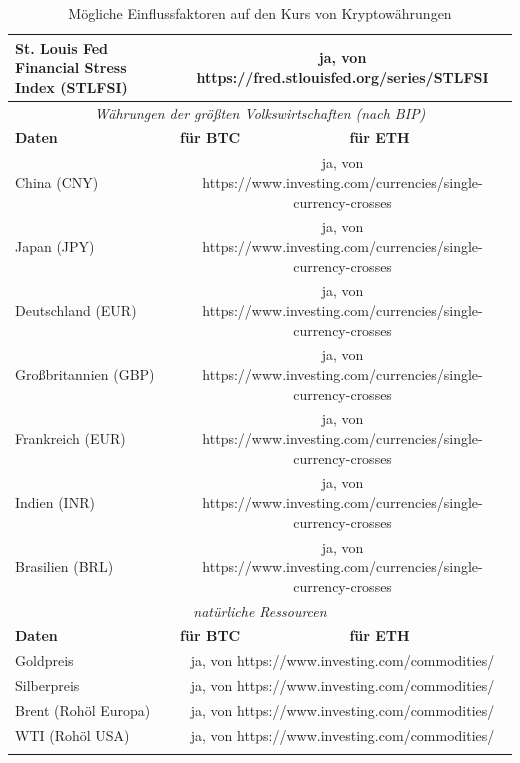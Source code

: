 \begin{longtable}[H]{|p{4cm}|p{}|p{}|}
St. Louis Fed Financial Stress Index (STLFSI) & \multicolumn{2}{c}{ja, von https://fred.stlouisfed.org/series/STLFSI}\\ \hline
\multicolumn{3}{c}{\textit{Währungen der größten Volkswirtschaften (nach BIP)}}\\ \hline
\textbf{Daten} & \textbf{für BTC} & \textbf{für ETH} \\
\hhline{===}
China (CNY) & \multicolumn{2}{c}{ja, von https://www.investing.com/currencies/single-currency-crosses}\\ \hline
Japan (JPY)& \multicolumn{2}{c}{ja, von https://www.investing.com/currencies/single-currency-crosses}\\ \hline
Deutschland (EUR) & \multicolumn{2}{c}{ja, von https://www.investing.com/currencies/single-currency-crosses}\\ \hline
Großbritannien  (GBP) & \multicolumn{2}{c}{ja, von https://www.investing.com/currencies/single-currency-crosses}\\ \hline
Frankreich (EUR) & \multicolumn{2}{c}{ja, von https://www.investing.com/currencies/single-currency-crosses}\\ \hline
Indien (INR) & \multicolumn{2}{c}{ja, von https://www.investing.com/currencies/single-currency-crosses}\\ \hline
Brasilien (BRL) & \multicolumn{2}{c}{ja, von https://www.investing.com/currencies/single-currency-crosses}\\ \hline
\multicolumn{3}{c}{\textit{natürliche Ressourcen}}\\ \hline
\textbf{Daten} & \textbf{für BTC} & \textbf{für ETH} \\
\hhline{===}
Goldpreis & \multicolumn{2}{c}{ja, von https://www.investing.com/commodities/}\\ \hline
Silberpreis & \multicolumn{2}{c}{ja, von https://www.investing.com/commodities/}\\ \hline
Brent (Rohöl Europa) & \multicolumn{2}{c}{ja, von https://www.investing.com/commodities/}\\ \hline
WTI (Rohöl USA) & \multicolumn{2}{c}{ja, von https://www.investing.com/commodities/}\\ \hline
\caption{Mögliche Einflussfaktoren auf den Kurs von Kryptowährungen}
\label{tab:dataToAnalyse}
\end{longtable}

